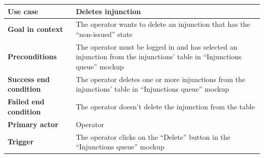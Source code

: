 {{{			\begin{center}
			\begin{tabular}{|p{4cm}|p{10cm}|}
			\hline
				\centering \vspace{1mm} \bfseries{Use case} \vspace{1mm} & 
				\vspace{1mm} Deletes injunction\vspace{1mm}\\
			\hline
				\centering \vspace{1mm} \bfseries{Goal in context} \vspace{1mm} & 
				\vspace{1mm} The operator wants to delete an injunction that has the “non-issued” state \vspace{1mm}\\
			\hline
				\centering \vspace{1mm} \bfseries{Preconditions} \vspace{1mm} & 
				\vspace{1mm} The operator must be logged in and has selected an injunction from the injunctions’ table in “Injunctions queue” mockup \vspace{1mm}\\
			\hline
				\centering \vspace{1mm} \bfseries{Success end condition} \vspace{1mm} & 
				\vspace{1mm} The operator deletes one or more injunctions from the injunctions’ table in “Injunctions queue” mockup \vspace{1mm}\\
			\hline
				\centering \vspace{1mm} \bfseries{Failed end condition} \vspace{1mm} & 
				\vspace{1mm} The operator doesn’t delete the injunction from the table\vspace{1mm}\\
			\hline
				\centering \vspace{1mm} \bfseries{Primary actor} \vspace{1mm} & 
				\vspace{1mm} Operator \vspace{1mm}\\
			\hline
				\centering \vspace{1mm} \bfseries{Trigger} \vspace{1mm} & 
				\vspace{1mm} The operator clicks on the “Delete” button in the “Injunctions queue” mockup\vspace{1mm}\\
			\hline
			\end{tabular}


\end{center}}}}
